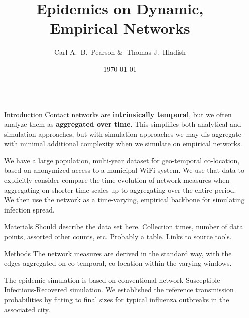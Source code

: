 \documentclass[final]{beamer} %
\title[Epi. on Emp. Nets]{Epidemics on Dynamic,\\ Empirical Networks}
\author[Pearson \& Hladish]{Carl A.~B.~Pearson \&\ Thomas J.~Hladish}
\institute[EPI-UF]{Emerging Pathogens Institute, University of Florida}
\date{\today}
\newcommand{\spacer}{\begin{column}{0.02\paperwidth}\end{column}}
\begin{document}

  \begin{frame}{}
    \begin{columns}[t]
    \spacer{}
    \begin{column}[t]{0.33\paperwidth}
    \begin{block}{Introduction}
Contact networks are \textbf{intrinsically temporal}, but we often analyze them as \textbf{aggregated over time}.  This simplifies both analytical and simulation approaches, but with simulation approaches we may dis-aggregate with minimal additional complexity when we simulate on empirical networks.

We have a large population, multi-year dataset for geo-temporal co-location, based on anonymized access to a municipal WiFi system.  We use that data to explicitly consider compare the time evolution of network measures when aggregating on shorter time scales up to aggregating over the entire period.  We then use the network as a time-varying, empirical backbone for simulating infection spread.
    \end{block}
    \begin{block}{Materials}
Should describe the data set here.  Collection times, number of data points, assorted other counts, etc.  Probably a table.  Links to source tools.
    \end{block}
    \begin{block}{Methods}
The network measures are derived in the standard way, with the edges aggregated on co-temporal, co-location within the varying windows. 

The epidemic simulation is based on conventional network Susceptible-Infectious-Recovered simulation.  We established the reference transmission probabilities by fitting to final sizes for typical influenza outbreaks in the associated city.


\end{block}
\end{column}
\end{columns}
\end{frame}
\end{document}
